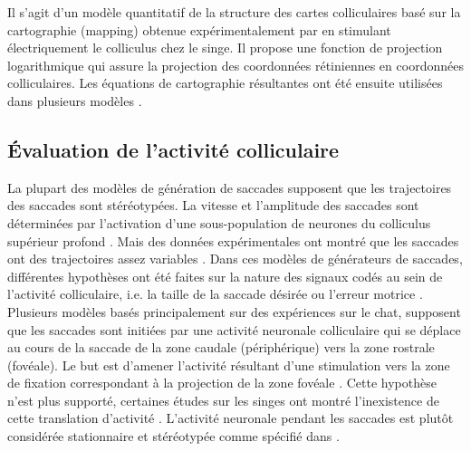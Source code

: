 Il s'agit d'un modèle quantitatif de la structure des cartes colliculaires basé sur la cartographie (mapping) obtenue expérimentalement par \cite{Robinson:1972} en stimulant électriquement le colliculus chez le singe. Il propose une fonction de projection logarithmique qui assure la projection des coordonnées rétiniennes en coordonnées colliculaires. Les équations de cartographie résultantes ont été ensuite utilisées dans plusieurs modèles \cite {VanGisbergen:1987,Optican:1995, Trappenberg:2001, Lefevre:1998, Marino:2008, Nakahara:2006}.\\

\subsection{\'Evaluation de l'activité colliculaire} {\label{eval}}

La plupart des modèles de génération de saccades supposent que les trajectoires des saccades sont stéréotypées. La vitesse et l'amplitude des saccades sont déterminées par l'activation d'une sous-population de neurones du colliculus supérieur profond \cite{Sparks:1990}. Mais des données expérimentales ont montré que les saccades ont des trajectoires assez variables \cite {Erkelens:1995}. Dans ces modèles de générateurs de saccades, différentes hypothèses ont été faites sur la nature des signaux codés au sein de l'activité colliculaire, i.e. la taille de la saccade désirée ou l'erreur motrice \cite{Waitzman:1988}. \\

Plusieurs modèles basés principalement sur des expériences sur le chat, supposent que les saccades sont initiées par une activité neuronale colliculaire qui se déplace au cours de la saccade de la zone caudale (périphérique) vers la zone rostrale (fovéale). Le but est d'amener l'activité résultant d'une stimulation vers la zone de fixation correspondant à la projection de la zone fovéale \cite {Droulez:1991, Lefevre:1992, Optican:1994 , Massonne:1994, Wurtz:1994, Schierwagen:1996, Grossberg:1997}. Cette hypothèse n'est plus supporté, certaines études sur les singes ont montré l'inexistence de cette translation d'activité \cite{Robijanto:2002}. L'activité neuronale pendant les saccades est plutôt considérée stationnaire et stéréotypée comme spécifié dans \cite {Anderson:1998}.\\


